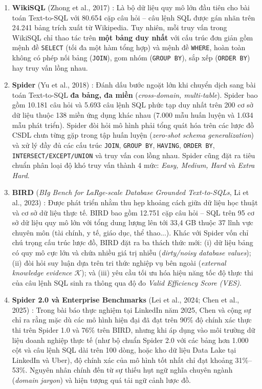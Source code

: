 \documentclass[12pt,a4paper]{report}
\begin{document}
\begin{enumerate}
    \item \textbf{WikiSQL} (Zhong et al., 2017) \cite{zhong2017wikisql}: Là bộ dữ liệu quy mô lớn đầu tiên cho bài toán Text-to-SQL với 80.654 cặp câu hỏi -- câu lệnh SQL được gán nhãn trên 24.241 bảng trích xuất từ Wikipedia. Tuy nhiên, mỗi truy vấn trong WikiSQL chỉ thao tác trên \textbf{một bảng duy nhất} với cấu trúc đơn giản gồm mệnh đề \texttt{SELECT} (tối đa một hàm tổng hợp) và mệnh đề \texttt{WHERE}, hoàn toàn không có phép nối bảng (\texttt{JOIN}), gom nhóm (\texttt{GROUP BY}), sắp xếp (\texttt{ORDER BY}) hay truy vấn lồng nhau.
    \item \textbf{Spider} (Yu et al., 2018) \cite{yu2018spider}: Đánh dấu bước ngoặt lớn khi chuyển dịch sang bài toán Text-to-SQL \textbf{đa bảng, đa miền} (\textit{cross-domain, multi-table}). Spider bao gồm 10.181 câu hỏi và 5.693 câu lệnh SQL phức tạp duy nhất trên 200 cơ sở dữ liệu thuộc 138 miền ứng dụng khác nhau (7.000 mẫu huấn luyện và 1.034 mẫu phát triển). Spider đòi hỏi mô hình phải tổng quát hóa trên các lược đồ CSDL chưa từng gặp trong tập huấn luyện (\textit{zero-shot schema generalization}) và xử lý đầy đủ các cấu trúc \texttt{JOIN}, \texttt{GROUP BY}, \texttt{HAVING}, \texttt{ORDER BY}, \texttt{INTERSECT/EXCEPT/UNION} và truy vấn con lồng nhau. Spider cũng đặt ra tiêu chuẩn phân loại độ khó truy vấn thành 4 mức: \textit{Easy, Medium, Hard} và \textit{Extra Hard}.
    \item \textbf{BIRD} (\textit{BIg Bench for LaRge-scale Database Grounded Text-to-SQLs}, Li et al., 2023) \cite{li2023bird}: Được phát triển nhằm thu hẹp khoảng cách giữa dữ liệu học thuật và cơ sở dữ liệu thực tế. BIRD bao gồm 12.751 cặp câu hỏi -- SQL trên 95 cơ sở dữ liệu quy mô lớn với tổng dung lượng lên tới 33,4 GB thuộc 37 lĩnh vực chuyên môn (tài chính, y tế, giáo dục, thể thao...). Khác với Spider vốn chỉ chú trọng cấu trúc lược đồ, BIRD đặt ra ba thách thức mới: (i) dữ liệu bảng có quy mô cực lớn và chứa nhiều giá trị nhiễu (\textit{dirty/noisy database values}); (ii) đòi hỏi suy luận dựa trên tri thức nghiệp vụ bên ngoài (\textit{external knowledge evidence $\mathcal{K}$}); và (iii) yêu cầu tối ưu hóa hiệu năng tốc độ thực thi của câu lệnh SQL sinh ra thông qua độ đo \textit{Valid Efficiency Score (VES)}.
    \item \textbf{Spider 2.0 và Enterprise Benchmarks} (Lei et al., 2024; Chen et al., 2025) \cite{lei2024spider2, chen2025enterprise}: Trong bài báo thực nghiệm tại LinkedIn năm 2025, Chen và cộng sự \cite{chen2025enterprise} chỉ ra rằng mặc dù các mô hình hiện đại đã đạt trên 90\% độ chính xác thực thi trên Spider 1.0 và 76\% trên BIRD, nhưng khi áp dụng vào môi trường dữ liệu doanh nghiệp thực tế (như bộ chuẩn Spider 2.0 \cite{lei2024spider2} với các bảng hơn 1.000 cột và câu lệnh SQL dài trên 100 dòng, hoặc kho dữ liệu Data Lake tại LinkedIn và Uber), độ chính xác của mô hình tốt nhất chỉ đạt khoảng 31\%--53\%. Nguyên nhân chính đến từ sự thiếu hụt ngữ nghĩa chuyên ngành (\textit{domain jargon}) và hiện tượng quá tải ngữ cảnh lược đồ.
\end{enumerate}
\end{document}
